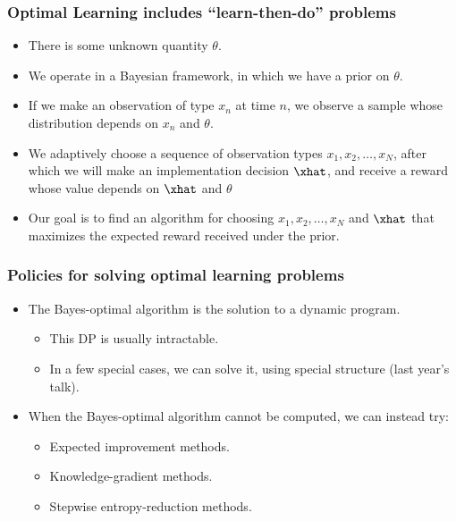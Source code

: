 \begin{frame}
  \frametitle{Optimal Learning includes ``learn-then-do'' problems}
  \begin{itemize}
    \item There is some unknown quantity $\theta$.
    \item We operate in a Bayesian framework, in which we have a prior on $\theta$.
    \item If we make an observation of type $x_n$ at time $n$, we observe a sample whose distribution depends on $x_n$ and $\theta$.
    \item We adaptively choose a sequence of observation types $x_1,x_2,\ldots,x_N$, after which we will make an implementation decision $\xhat$, and receive a reward whose value depends on $\xhat$ and $\theta$
    \item Our goal is to find an algorithm for choosing $x_1,x_2,\ldots,x_N$ and $\xhat$ that maximizes the expected reward received under the prior.
  \end{itemize}
\end{frame}

\begin{frame}
  \frametitle{Policies for solving optimal learning problems}
  \begin{itemize}
    \item The Bayes-optimal algorithm is the solution to a dynamic program.
      \begin{itemize}
	\item This DP is usually intractable.
	\item In a few special cases, we can solve it, using special structure (last year's talk).
      \end{itemize}
    \item When the Bayes-optimal algorithm cannot be computed, we can instead try:
      \begin{itemize}
	\item Expected improvement methods.
	\item Knowledge-gradient methods.
	\item Stepwise entropy-reduction methods.
      \end{itemize}
  \end{itemize}
\end{frame}


